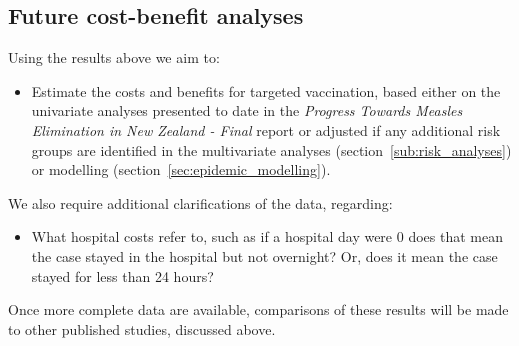 \documentclass{article}
\begin{document}
\subsection{Future cost-benefit analyses}
Using the results above we aim to:
\begin{itemize}
\item Estimate the costs and benefits for targeted vaccination, based either on the univariate analyses presented to date in the \emph {Progress Towards Measles Elimination in New Zealand - Final} report or adjusted if any additional risk groups are identified in the multivariate analyses (section~\ref{sub:risk_analyses}) or modelling (section~\ref{sec:epidemic_modelling}).
\end{itemize}

We also require additional clarifications of the data, regarding:
\begin {itemize}
\item What hospital costs refer to, such as if a hospital day were 0 does that mean the case stayed in the hospital but not overnight? Or, does it mean the case stayed for less than 24 hours?
\end {itemize}
Once more complete data are available, comparisons of these results will be made to other published studies, discussed above.
\end{document}
